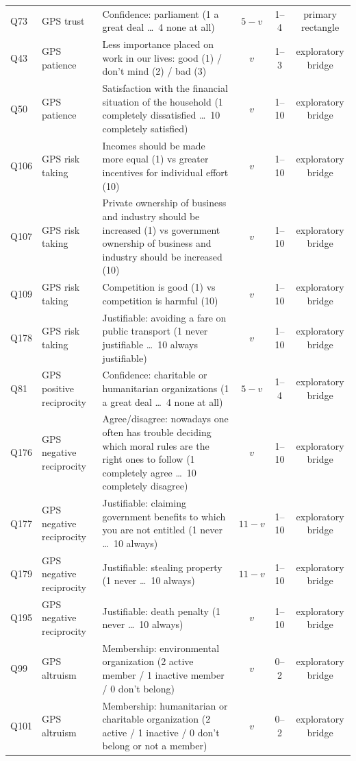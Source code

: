 \begin{table}[p]
\begin{tabularx}{\textwidth}{llXccc}
Q73 & GPS trust & Confidence: parliament (1 a great deal \dots\ 4 none at all) & $5-v$ & 1--4 & primary rectangle \\
Q43 & GPS patience & Less importance placed on work in our lives: good (1) / don't mind (2) / bad (3) & $v$ & 1--3 & exploratory bridge \\
Q50 & GPS patience & Satisfaction with the financial situation of the household (1 completely dissatisfied \dots\ 10 completely satisfied) & $v$ & 1--10 & exploratory bridge \\
Q106 & GPS risk taking & Incomes should be made more equal (1) vs greater incentives for individual effort (10) & $v$ & 1--10 & exploratory bridge \\
Q107 & GPS risk taking & Private ownership of business and industry should be increased (1) vs government ownership of business and industry should be increased (10) & $v$ & 1--10 & exploratory bridge \\
Q109 & GPS risk taking & Competition is good (1) vs competition is harmful (10) & $v$ & 1--10 & exploratory bridge \\
Q178 & GPS risk taking & Justifiable: avoiding a fare on public transport (1 never justifiable \dots\ 10 always justifiable) & $v$ & 1--10 & exploratory bridge \\
Q81 & GPS positive reciprocity & Confidence: charitable or humanitarian organizations (1 a great deal \dots\ 4 none at all) & $5-v$ & 1--4 & exploratory bridge \\
Q176 & GPS negative reciprocity & Agree/disagree: nowadays one often has trouble deciding which moral rules are the right ones to follow (1 completely agree \dots\ 10 completely disagree) & $v$ & 1--10 & exploratory bridge \\
Q177 & GPS negative reciprocity & Justifiable: claiming government benefits to which you are not entitled (1 never \dots\ 10 always) & $11-v$ & 1--10 & exploratory bridge \\
Q179 & GPS negative reciprocity & Justifiable: stealing property (1 never \dots\ 10 always) & $11-v$ & 1--10 & exploratory bridge \\
Q195 & GPS negative reciprocity & Justifiable: death penalty (1 never \dots\ 10 always) & $v$ & 1--10 & exploratory bridge \\
Q99 & GPS altruism & Membership: environmental organization (2 active member / 1 inactive member / 0 don't belong) & $v$ & 0--2 & exploratory bridge \\
Q101 & GPS altruism & Membership: humanitarian or charitable organization (2 active / 1 inactive / 0 don't belong or not a member) & $v$ & 0--2 & exploratory bridge \\

\end{tabularx}
\end{table}

